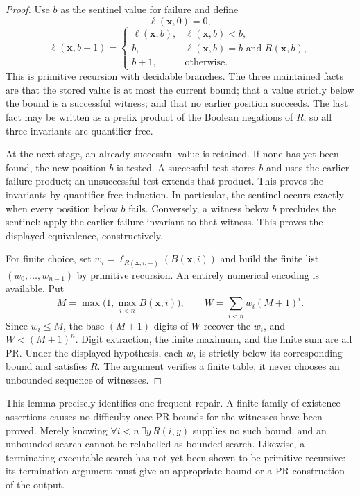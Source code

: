 \begin{proof}
Use $b$ as the sentinel value for failure and define
\[
 \ell(\boldsymbol x,0)=0,
\]
\[
 \ell(\boldsymbol x,b+1)=
 \begin{cases}
   \ell(\boldsymbol x,b),&\ell(\boldsymbol x,b)<b,\\
   b,&\ell(\boldsymbol x,b)=b\text{ and }R(\boldsymbol x,b),\\
   b+1,&\text{otherwise}.
 \end{cases}
\]
This is primitive recursion with decidable branches.  The three maintained
facts are that the stored value is at most the current bound; that a value
strictly below the bound is a successful witness; and that no earlier position
succeeds.  The last fact may be written as a prefix product of the Boolean
negations of $R$, so all three invariants are quantifier-free.

At the next stage, an already successful value is retained.  If none has yet
been found, the new position $b$ is tested.  A successful test stores $b$ and
uses the earlier failure product; an unsuccessful test extends that product.
This proves the invariants by quantifier-free induction.  In particular, the
sentinel occurs exactly when every position below $b$ fails.  Conversely, a
witness below $b$ precludes the sentinel: apply the earlier-failure invariant
to that witness.  This proves the displayed equivalence, constructively.

For finite choice, set
$w_i=\ell_{R(\boldsymbol x,i,-)}(B(\boldsymbol x,i))$ and build the finite
list $(w_0,\ldots,w_{n-1})$ by primitive recursion.  An entirely numerical
encoding is available.  Put
\[
 M=\max\bigl(1,\max_{i<n}B(\boldsymbol x,i)\bigr),\qquad
 W=\sum_{i<n}w_i(M+1)^i.
\]
Since $w_i\le M$, the base-$(M+1)$ digits of $W$ recover the $w_i$, and
$W<(M+1)^n$.  Digit extraction, the finite maximum, and the finite sum are all
PR.  Under the displayed hypothesis, each $w_i$ is strictly below its
corresponding bound and satisfies $R$.  The argument verifies a finite table;
it never chooses an unbounded sequence of witnesses.
\end{proof}

This lemma precisely identifies one frequent repair.  A finite family of
existence assertions causes no difficulty once PR bounds for the witnesses
have been proved.  Merely knowing $\forall i<n\,\exists y\,R(i,y)$ supplies no
such bound, and an unbounded search cannot be relabelled as bounded search.
Likewise, a terminating executable search has not yet been shown to be
primitive recursive: its termination argument must give an appropriate
bound or a PR construction of the output.


